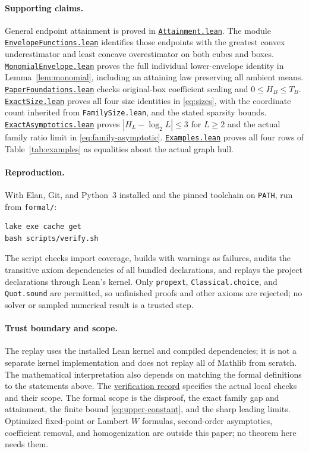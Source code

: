 \documentclass[11pt]{article}
\theoremstyle{remark}
\newcommand{\leanfile}[2]{\href{formal/Formal/#1.lean}{\texttt{#2}}}
\begin{document}
\paragraph{Supporting claims.}
General endpoint attainment is proved in
\leanfile{MultilinearGap/Attainment}{Attainment.lean}. The module
\leanfile{MultilinearGap/EnvelopeFunctions}{EnvelopeFunctions.lean}
identifies those endpoints with the greatest convex underestimator and
least concave overestimator on both cubes and boxes.
\leanfile{MultilinearGap/MonomialEnvelope}{MonomialEnvelope.lean}
proves the full individual lower-envelope identity in
Lemma~\ref{lem:monomial}, including an attaining law preserving all
ambient means.
\leanfile{MultilinearGap/PaperFoundations}{PaperFoundations.lean}
checks original-box coefficient scaling and $0\le H_B\le T_B$.
\leanfile{MultilinearGap/ExactSize}{ExactSize.lean} proves all four size
identities in \eqref{eq:sizes}, with the coordinate count inherited from
\texttt{FamilySize.lean}, and the stated sparsity bounds.
\leanfile{MultilinearGap/ExactAsymptotics}{ExactAsymptotics.lean} proves
$|H_L-\log_2L|\le3$ for $L\ge2$ and the actual family ratio limit in
\eqref{eq:family-asymptotic}.
\leanfile{MultilinearGap/Examples}{Examples.lean} proves all four rows of
Table~\ref{tab:examples} as equalities about the actual graph hull.

\paragraph{Reproduction.}
With Elan, Git, and Python~3 installed and the pinned toolchain on
\texttt{PATH}, run from \texttt{formal/}:
\begin{verbatim}
lake exe cache get
bash scripts/verify.sh
\end{verbatim}
The script checks import coverage, builds with warnings as failures,
audits the transitive axiom dependencies of all bundled declarations,
and replays the project declarations through Lean's kernel. Only
\texttt{propext}, \texttt{Classical.choice}, and \texttt{Quot.sound}
are permitted, so unfinished proofs and other axioms are rejected; no
solver or sampled numerical result is a trusted step.

\paragraph{Trust boundary and scope.}
The replay uses the installed Lean kernel and compiled dependencies; it
is not a separate kernel implementation and does not replay all of
Mathlib from scratch. The mathematical interpretation also depends on
matching the formal definitions to the statements above. The
\href{formal/VERIFICATION.md}{verification record} specifies the actual
local checks and their scope. The formal scope is the disproof, the exact
family gap and attainment, the finite bound \eqref{eq:upper-constant},
and the sharp leading limits. Optimized fixed-point or Lambert $W$
formulas, second-order asymptotics, coefficient removal, and
homogenization are outside this paper; no theorem here needs them.



\end{document}
